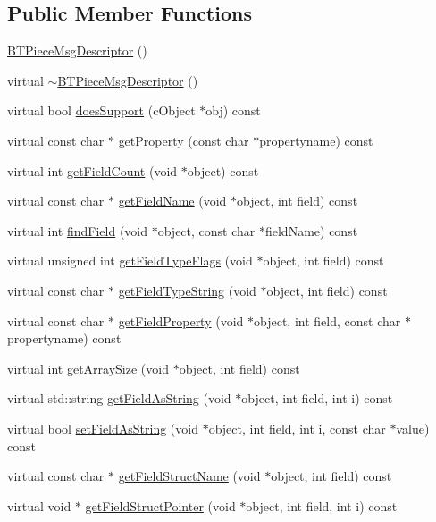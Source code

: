 \subsection*{Public Member Functions}
\begin{DoxyCompactItemize}
\item 
\hyperlink{classBTPieceMsgDescriptor_ae84cd0e4aff65353a9124aee15876be8}{B\+T\+Piece\+Msg\+Descriptor} ()
\item 
virtual \hyperlink{classBTPieceMsgDescriptor_abee9379ba36c2c8cb930dc1ff9d05238}{$\sim$\+B\+T\+Piece\+Msg\+Descriptor} ()
\item 
virtual bool \hyperlink{classBTPieceMsgDescriptor_a59a58763b2753bc4e1f0e986a546fde2}{does\+Support} (c\+Object $\ast$obj) const 
\item 
virtual const char $\ast$ \hyperlink{classBTPieceMsgDescriptor_aa153a7a47256913d4fe69930aeae7462}{get\+Property} (const char $\ast$propertyname) const 
\item 
virtual int \hyperlink{classBTPieceMsgDescriptor_a641b734a4a3bc62caaa6ebaab49b2094}{get\+Field\+Count} (void $\ast$object) const 
\item 
virtual const char $\ast$ \hyperlink{classBTPieceMsgDescriptor_af00965c5ab3b862e6d58c70aea43ea8a}{get\+Field\+Name} (void $\ast$object, int field) const 
\item 
virtual int \hyperlink{classBTPieceMsgDescriptor_a460c1ad87acf58088cbc820846750565}{find\+Field} (void $\ast$object, const char $\ast$field\+Name) const 
\item 
virtual unsigned int \hyperlink{classBTPieceMsgDescriptor_a5c482406d825929f1878ec22b781e9b2}{get\+Field\+Type\+Flags} (void $\ast$object, int field) const 
\item 
virtual const char $\ast$ \hyperlink{classBTPieceMsgDescriptor_af000de1ab6182695034aeb0fb6fdfa0a}{get\+Field\+Type\+String} (void $\ast$object, int field) const 
\item 
virtual const char $\ast$ \hyperlink{classBTPieceMsgDescriptor_afd666218833cd580b45be5e05c435dea}{get\+Field\+Property} (void $\ast$object, int field, const char $\ast$propertyname) const 
\item 
virtual int \hyperlink{classBTPieceMsgDescriptor_a6e4a8fadd723fab1b3077d27a32deeca}{get\+Array\+Size} (void $\ast$object, int field) const 
\item 
virtual std\+::string \hyperlink{classBTPieceMsgDescriptor_a2790505d6b2ee409573346e135b06e9b}{get\+Field\+As\+String} (void $\ast$object, int field, int i) const 
\item 
virtual bool \hyperlink{classBTPieceMsgDescriptor_a9615195a8841c118b13d378e4d0a8f7f}{set\+Field\+As\+String} (void $\ast$object, int field, int i, const char $\ast$value) const 
\item 
virtual const char $\ast$ \hyperlink{classBTPieceMsgDescriptor_a6e2aa3f4ec5e540bf43f4e277e7c3d79}{get\+Field\+Struct\+Name} (void $\ast$object, int field) const 
\item 
virtual void $\ast$ \hyperlink{classBTPieceMsgDescriptor_a7ed387291492374f2bea1b1f58597d83}{get\+Field\+Struct\+Pointer} (void $\ast$object, int field, int i) const 
\end{DoxyCompactItemize}


